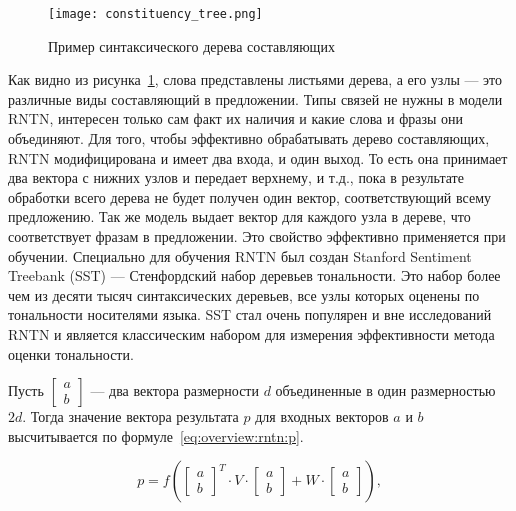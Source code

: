 \begin{figure}[h]
  \begin{center}
    \texttt{[image: constituency\_tree.png]}
    \caption{Пример синтаксического дерева составляющих\cite{wiki:dep_grammar}}\label{fig:overview:constituency_tree}
  \end{center}
\end{figure}

Как видно из рисунка~\ref{fig:overview:constituency_tree}, слова представлены листьями дерева, а его узлы --- это различные виды составляющий в предложении. Типы связей не нужны в модели RNTN, интересен только сам факт их наличия и какие слова и фразы они объединяют. Для того, чтобы эффективно обрабатывать дерево составляющих, RNTN модифицирована и имеет два входа, и один выход. То есть она принимает два вектора с нижних узлов и передает верхнему, и т.д., пока в результате обработки всего дерева не будет получен один вектор, соответствующий всему предложению. Так же модель выдает вектор для каждого узла в дереве, что соответствует фразам в предложении. Это свойство эффективно применяется при обучении. Специально для обучения RNTN был создан Stanford Sentiment Treebank (SST) --- Стенфордский набор деревьев тональности. Это набор более чем из десяти тысяч синтаксических деревьев, все узлы которых оценены по тональности носителями языка. SST стал очень популярен и вне исследований RNTN и является классическим набором для измерения эффективности метода оценки тональности\cite{RNTN}.

Пусть $\begin{bmatrix}a\\b\end{bmatrix}$ --- два вектора размерности $d$ объединенные в один размерностью $2d$. Тогда значение вектора результата $p$ для входных векторов $a$ и $b$ высчитывается по формуле~\ref{eq:overview:rntn:p}\cite{RNTN}.

\begin{equation}
  \label{eq:overview:rntn:p}
  p = f(
  \begin{bmatrix}
    a\\
    b
  \end{bmatrix}^{T}\cdot{V}\cdot{
  \begin{bmatrix}
    a\\
    b
  \end{bmatrix}} + W\cdot{
  \begin{bmatrix}
    a\\
    b
  \end{bmatrix}}),
\end{equation}

